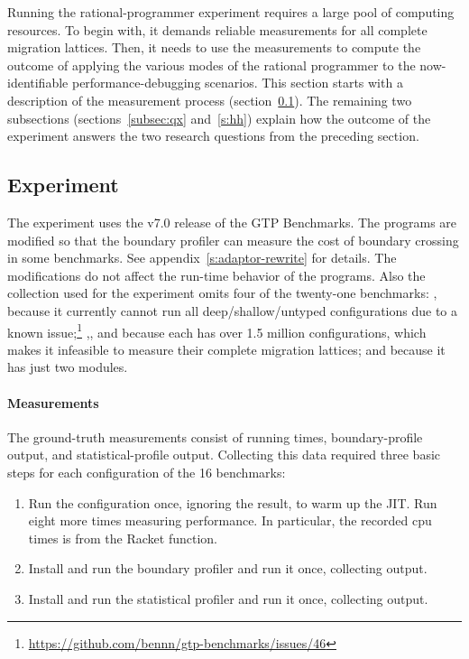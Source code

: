 \newcommand{\numgtp}{16}
\newcommand{\boundaryMB}{536} %
\newcommand{\statisticalMB}{4645} %
\newcommand{\runtimeMB}{44}

Running the rational-programmer experiment requires a large pool of computing
resources.  To begin with, it demands reliable measurements for all complete
migration lattices. Then, it needs to use the measurements to compute the
outcome of applying the various modes of the rational programmer to the
now-identifiable performance-debugging scenarios. This section starts with a
description of the measurement process (section~\ref{subsec:experiment}). The
remaining two subsections (sections~\ref{subsec:qx} and~\ref{s:hh}) explain how
the outcome of the experiment answers the two research questions from the
preceding section.

\subsection{Experiment} \label{subsec:experiment} \label{sec:data}

The experiment uses the v7.0 release of the GTP Benchmarks. The programs are
modified so that the boundary profiler can measure the cost of boundary crossing
in some benchmarks. See appendix~\ref{s:adaptor-rewrite} for details.  The
modifications do not affect the run-time behavior of the programs.  Also the
collection used for the experiment omits four of the twenty-one benchmarks:
, because it currently cannot run all deep/shallow/untyped
configurations due to a known issue;\footnote{
\url{https://github.com/bennn/gtp-benchmarks/issues/46}}
,, and  because each has over 1.5
million configurations, which makes it infeasible to measure their complete
migration lattices; and  because it has just two modules.

\paragraph{Measurements} 

The ground-truth measurements consist of running times, boundary-profile output,
and statistical-profile output.  Collecting this data required three basic steps
for each configuration of the \numgtp{} benchmarks:
\begin{enumerate}

\item Run the configuration once, ignoring the result, to warm up the JIT.  Run
    eight more times measuring performance.  In particular, the recorded {cpu
    time}s is from the Racket  function.

\item Install and run the boundary profiler and run it once, collecting output.

\item Install and run the statistical profiler and run it once, collecting
output.

\end{enumerate}

